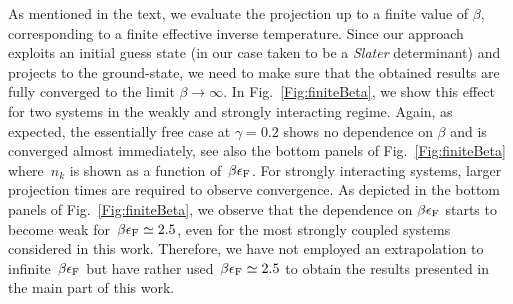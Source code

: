 \documentclass[pra,aps,groupedaddress,floatfix,twocolumn,superscriptaddress,showpacs,nofootinbib]{revtex4-1}
\begin{document}
As mentioned in the text, we evaluate the projection up to a finite value of $\beta$,
corresponding to a finite effective inverse temperature. Since our approach
exploits an initial guess state (in our case taken to be a {\it Slater} determinant) and
projects to the ground-state, we need to make sure that the obtained results are fully
converged to the limit $\beta\to\infty$. {In Fig.~\ref{Fig:finiteBeta}, we show this effect for
two systems in the weakly and {strongly interacting regime. Again, as expected, the essentially
free case at $\gamma = 0.2$ shows no dependence on $\beta$ and is converged almost immediately, see also the bottom panels
of Fig.~\ref{Fig:finiteBeta} where~$n_k$ is shown as a function of~$\beta\epsilon_{\rm F}$.
For strongly interacting systems, larger projection times are required to observe convergence. As
depicted in the bottom panels of
Fig.~\ref{Fig:finiteBeta}, we observe that the dependence on $\beta\epsilon_{\rm F}$ starts to become
weak for~$\beta \epsilon_{\rm F} \simeq 2.5$, even for
the most strongly coupled systems considered in this work. Therefore, we have not employed an extrapolation to infinite~$\beta\epsilon_{\rm F}$
but have rather used~$\beta \epsilon_{\rm F} \simeq 2.5$ to obtain the results presented in the main part of this work.}}



\end{document}
